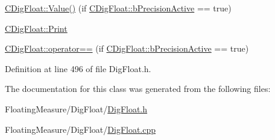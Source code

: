 \begin{DoxyItemize}
\item \hyperlink{classCDigFloat_af74b8cd0935294b6371f551b7a1ff640}{C\+Dig\+Float\+::\+Value()} (if \hyperlink{classCDigFloat_aa1f6ed0312a2aa6ae5ee2abd195adefc}{C\+Dig\+Float\+::b\+Precision\+Active} == true)
\item \hyperlink{classCDigFloat_a80731e0970f607114d6d1bde4d02bd39}{C\+Dig\+Float\+::\+Print}
\item \hyperlink{classCDigFloat_ad8980d984bf2bab71d15b830fd0180a5}{C\+Dig\+Float\+::operator==} (if \hyperlink{classCDigFloat_aa1f6ed0312a2aa6ae5ee2abd195adefc}{C\+Dig\+Float\+::b\+Precision\+Active} == true) 
\end{DoxyItemize}

Definition at line 496 of file Dig\+Float.\+h.



The documentation for this class was generated from the following files\+:\begin{DoxyCompactItemize}
\item 
Floating\+Measure/\+Dig\+Float/\hyperlink{DigFloat_8h}{Dig\+Float.\+h}\item 
Floating\+Measure/\+Dig\+Float/\hyperlink{DigFloat_8cpp}{Dig\+Float.\+cpp}\end{DoxyCompactItemize}
